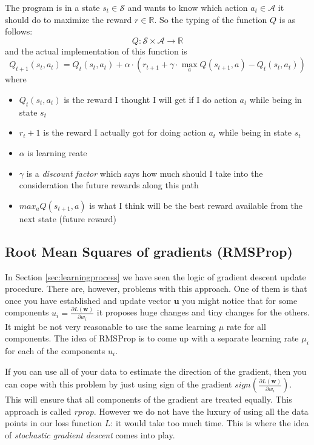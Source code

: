 \documentclass[a4paper,12pt]{article}
\begin{document}
The program is in a state $s_t \in \mathcal{S}$ and wants to know which action $a_t \in \mathcal{A}$ it should do to maximize the reward $r \in \mathds{R}$. So the typing of the function $Q$ is as follows:
$$Q: \mathcal{S} \times \mathcal{A} \rightarrow  \mathds{R}$$
and the actual implementation of this function is
$$Q_{t+1}(s_t, a_t) = Q_t(s_t, a_t) + \alpha\cdot(r_{t+1} + \gamma\cdot\max_{a}Q(s_{t+1}, a) - Q_t(s_t, a_t))$$
where
\begin{itemize}
	\itemsep 0em
	\item[] $Q_t(s_t, a_t)$ is the reward I thought I will get if I do action $a_t$ while being in state $s_t$
	\item[] $r_t+1$ is the reward I actually got for doing action $a_t$ while being in state $s_t$
	\item[] $\alpha$ is learning reate
	\item[] $\gamma$ is a \emph{discount factor} which says how much should I take into the consideration the future rewards along this path
	\item[] $max_{a}Q(s_{t+1}, a)$ is what I think will be the best reward available from the next state (future reward)
\end{itemize}

\subsection{Root Mean Squares of gradients (RMSProp)}
In Section \ref{sec:learningprocess} we have seen the logic of gradient descent update procedure. There are, however, problems with this approach. One of them is that once you have established and update vector $\mathbf{u}$ you might notice that for some components $u_i = \frac{\partial L(\mathbf{w})}{\partial w_i}$ it proposes huge changes and tiny changes for the others. It might be not very reasonable to use the same learning $\mu$ rate for all components. The idea of RMSProp is to come up with a separate learning rate $\mu_i$ for each of the components $u_i$.

If you can use all of your data to estimate the direction of the gradient, then you can cope with this problem by just using sign of the gradient $sign(\frac{\partial L(\mathbf{w})}{\partial w_i})$. This will ensure that all components of the gradient are treated equally. This approach is called \emph{rprop}. However we do not have the luxury of using all the data points in our loss function $L$: it would take too much time. This is where the idea of \emph{stochastic gradient descent} comes into play.
\end{document}
